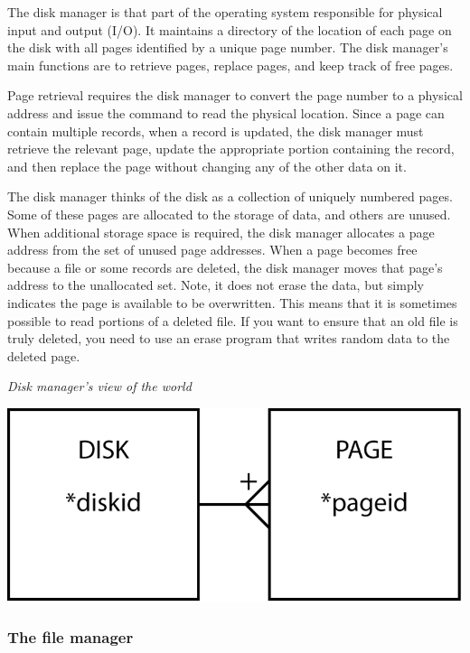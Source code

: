 \documentclass[
]{article}
\begin{document}
The disk manager is that part of the operating system responsible for
physical input and output (I/O). It maintains a directory of the
location of each page on the disk with all pages identified by a unique
page number. The disk manager's main functions are to retrieve pages,
replace pages, and keep track of free pages.

Page retrieval requires the disk manager to convert the page number to a
physical address and issue the command to read the physical location.
Since a page can contain multiple records, when a record is updated, the
disk manager must retrieve the relevant page, update the appropriate
portion containing the record, and then replace the page without
changing any of the other data on it.

The disk manager thinks of the disk as a collection of uniquely numbered
pages. Some of these pages are allocated to the storage of data, and
others are unused. When additional storage space is required, the disk
manager allocates a page address from the set of unused page addresses.
When a page becomes free because a file or some records are deleted, the
disk manager moves that page's address to the unallocated set. Note, it
does not erase the data, but simply indicates the page is available to
be overwritten. This means that it is sometimes possible to read
portions of a deleted file. If you want to ensure that an old file is
truly deleted, you need to use an erase program that writes random data
to the deleted page.

\emph{Disk manager's view of the world}

\includegraphics{Figures/Chapter 20/disk-manager.png}

\hypertarget{the-file-manager}{%
\subsubsection*{The file manager}\label{the-file-manager}}
\end{document}
